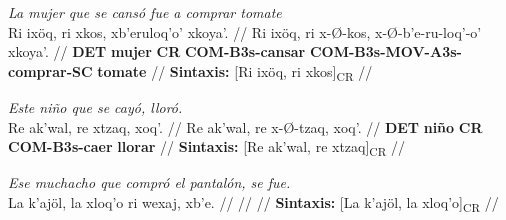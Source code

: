 \documentclass{article}%
\begin{document}
%
\par\medskip%
\ex
\textit{La mujer que se cansó fue a comprar tomate} \\
\begingl
\gla Ri ixöq, ri xkos, xb'eruloq'o' xkoya'. //
\glb Ri ixöq, ri x-Ø-kos, x-Ø-b'e-ru-loq'-o' xkoya'. //
\glc \textbf{DET} \textbf{mujer} \textbf{CR} \textbf{COM-}\textbf{B3s-}\textbf{cansar} \textbf{COM-}\textbf{B3s-}\textbf{MOV-}\textbf{A3s-}\textbf{comprar-}\textbf{SC} \textbf{tomate} //
\glft \textbf{Sintaxis:} [Ri ixöq, ri xkos]\textsubscript{CR} //
\endgl
\xe
%
\medskip%
\par\medskip%
\ex
\textit{Este niño que se cayó, lloró.} \\
\begingl
\gla Re ak'wal, re xtzaq, xoq'. //
\glb Re ak'wal, re x-Ø-tzaq, xoq'. //
\glc \textbf{DET} \textbf{niño} \textbf{CR} \textbf{COM-}\textbf{B3s-}\textbf{caer} \textbf{llorar} //
\glft \textbf{Sintaxis:} [Re ak'wal, re xtzaq]\textsubscript{CR} //
\endgl
\xe
%
\medskip%
\par\medskip%
\ex
\textit{Ese muchacho que compró el pantalón, se fue.} \\
\begingl
\gla La k'ajöl, la xloq'o ri wexaj, xb'e. //
\glb  //
\glc  //
\glft \textbf{Sintaxis:} [La k'ajöl, la xloq'o]\textsubscript{CR} //
\endgl
\xe
%
\medskip

%
\end{document}

